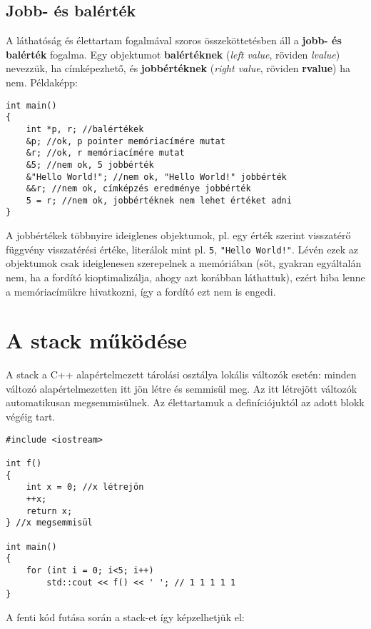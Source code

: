 \documentclass[a4paper,11.5pt,table]{article}
\begin{document}
	\subsection{Jobb- és balérték}
	A láthatóság és élettartam fogalmával szoros összeköttetésben áll a \textbf{jobb- és balérték} fogalma. Egy objektumot \textbf{balértéknek} (\textit{left value}, röviden \textit{lvalue}) nevezzük, ha címképezhető, és \textbf{jobbértéknek} (\textit{right value}, röviden \textbf{rvalue}) ha nem. Példaképp:
	\begin{lstlisting}
int main()
{
	int *p, r; //balértékek
	&p; //ok, p pointer memóriacímére mutat
	&r; //ok, r memóriacímére mutat
	&5; //nem ok, 5 jobbérték
	&"Hello World!"; //nem ok, "Hello World!" jobbérték
	&&r; //nem ok, címképzés eredménye jobbérték
	5 = r; //nem ok, jobbértéknek nem lehet értéket adni
}
	\end{lstlisting}
	A jobbértékek többnyire ideiglenes objektumok, pl. egy érték szerint visszatérő függvény visszatérési értéke,  literálok mint pl. \texttt{5}, \texttt{"Hello World!"}. Lévén ezek az objektumok csak ideiglenesen szerepelnek a memóriában (sőt, gyakran egyáltalán nem, ha a fordító kioptimalizálja, ahogy azt korábban láthattuk), ezért hiba lenne a memóriacímükre hivatkozni, így a fordító ezt nem is engedi.
	\section{A stack működése}
	A stack a C++ alapértelmezett tárolási osztálya lokális változók esetén: minden változó alapértelmezetten itt jön létre és semmisül meg. Az itt létrejött változók automatikusan megsemmisülnek. Az élettartamuk a definíciójuktól az adott blokk végéig tart.
	
	\begin{lstlisting}
#include <iostream>

int f()
{
	int x = 0; //x létrejön
	++x;
	return x;
} //x megsemmisül

int main()
{
	for (int i = 0; i<5; i++)
		std::cout << f() << ' '; // 1 1 1 1 1
}
	\end{lstlisting}
	\medskip
	
	A fenti kód futása során a stack-et így képzelhetjük el:
	
\end{document}
